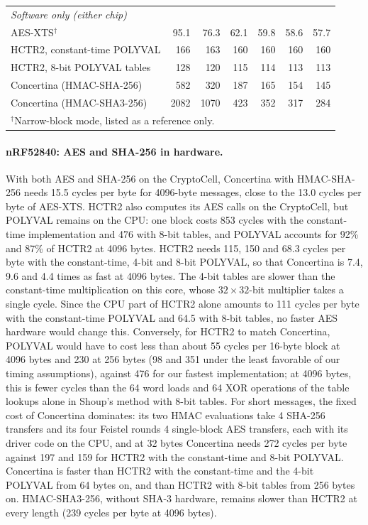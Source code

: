 \begin{table}[!hbt]
\begin{tabular}{lrrrrrr}
\hline
\multicolumn{7}{l}{\emph{Software only (either chip)}} \\
AES-XTS$^\dagger$                                    & 95.1 & 76.3 & 62.1 & 59.8 & 58.6 & 57.7 \\
HCTR2, constant-time POLYVAL                         & 166 & 163 & 160 & 160 & 160 & 160 \\
HCTR2, 8-bit POLYVAL tables                          & 128 & 120 & 115 & 114 & 113 & 113 \\
Concertina (HMAC-SHA-256)                            & 582 & 320 & 187 & 165 & 154 & 145 \\
Concertina (HMAC-SHA3-256)                           & 2082 & 1070 & 423 & 352 & 317 & 284 \\
\hline
\multicolumn{7}{l}{\footnotesize $^\dagger$Narrow-block mode, listed as a reference only.}
\end{tabular}
\end{table}

\paragraph{nRF52840: AES and SHA-256 in hardware.}
With both AES and SHA-256 on the CryptoCell, Concertina with HMAC-SHA-256
needs 15.5 cycles per byte for 4096-byte messages, close to the
13.0 cycles per byte of AES-XTS. HCTR2 also computes its AES calls
on the CryptoCell, but POLYVAL remains on the CPU: one block costs
853 cycles with the constant-time implementation and
476 with 8-bit tables, and POLYVAL accounts for
92\% and 87\% of HCTR2 at 4096
bytes. HCTR2 needs 115, 150 and 68.3
cycles per byte with the constant-time, 4-bit and 8-bit POLYVAL, so that
Concertina is 7.4, 9.6 and
4.4 times as fast at 4096 bytes. The 4-bit tables are
slower than the constant-time multiplication on this core, whose
$32 \times 32$-bit multiplier takes a single cycle. Since the CPU
part of HCTR2 alone amounts to 111 cycles per byte with the
constant-time POLYVAL and 64.5 with 8-bit tables, no faster
AES hardware would change this. Conversely, for HCTR2 to match
Concertina, POLYVAL would have to cost less than about 55
cycles per 16-byte block at 4096 bytes and 230 at 256 bytes
(98 and 351 under the least favorable of
our timing assumptions), against 476 for our fastest
implementation; at 4096 bytes, this is fewer cycles than the 64 word loads
and 64 XOR operations of the table lookups alone in Shoup's method with 8-bit
tables. For short messages, the fixed cost of
Concertina dominates: its two HMAC evaluations take 4
SHA-256 transfers and its four Feistel rounds 4
single-block AES transfers, each with its driver code on the CPU, and at 32
bytes Concertina needs 272 cycles per byte against 197
and 159 for HCTR2 with the constant-time and 8-bit POLYVAL.
Concertina is faster than HCTR2 with the constant-time and the 4-bit POLYVAL
from 64 bytes on, and than HCTR2 with 8-bit tables from
256 bytes on.
HMAC-SHA3-256, without SHA-3 hardware, remains slower than HCTR2 at every
length (239 cycles per byte at 4096 bytes).

